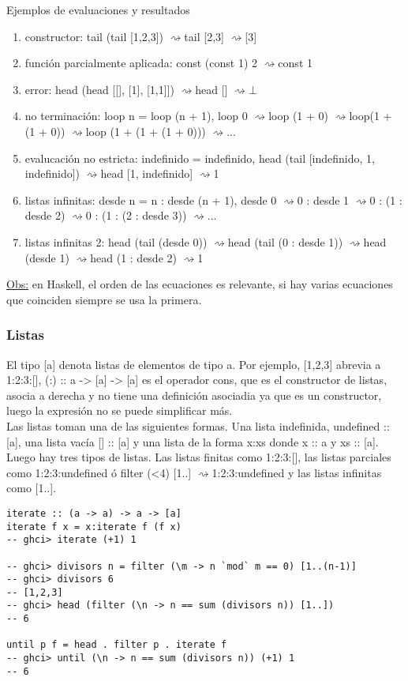 \documentclass[12pt]{extarticle}
\def\observacion{\underline{Obs:} }
\def\eval{$\rightsquigarrow$}
\begin{document}
Ejemplos de evaluaciones y resultados
\begin{enumerate}
\itemsep-0.35em 
\item constructor: tail (tail [1,2,3]) \eval tail [2,3] \eval [3]
\item función parcialmente aplicada: const (const 1) 2 \eval const 1
\item error: head (head [[], [1], [1,1]]) \eval head [] \eval $\bot$
\item no terminación: loop n = loop (n + 1), loop 0 \eval loop (1 + 0) \eval loop(1 + (1 + 0)) \eval loop (1 + (1 + (1 + 0))) \eval ...
\item evalucación no estricta: indefinido = indefinido, head (tail [indefinido, 1, indefinido]) \eval head [1, indefinido] \eval 1
\item listas infinitas: desde n = n : desde (n + 1), desde 0 \eval 0 : desde 1 \eval 0 : (1 : desde 2) \eval 0 : (1 : (2 : desde 3)) \eval ...
\item listas infinitas 2: head (tail (desde 0)) \eval head (tail (0 : desde 1)) \eval head (desde 1) \eval head (1 : desde 2) \eval 1
\end{enumerate}

\observacion en Haskell, el orden de las ecuaciones es relevante, si hay varias ecuaciones que coinciden siempre se usa la primera.

\subsubsection{Listas}
El tipo [a] denota listas de elementos de tipo a. Por ejemplo, [1,2,3] abrevia a 1:2:3:[], (:) :: a -> [a] -> [a] es el operador cons, que es el constructor de listas, asocia a derecha y no tiene una definición asociadia ya que es un constructor, luego la expresión no se puede simplificar más. \\
Las listas toman una de las siguientes formas. Una lista indefinida, undefined :: [a], una lista vacía [] :: [a] y una lista de la forma x:xs donde x :: a y xs :: [a]. \\
Luego hay tres tipos de listas. Las listas finitas como 1:2:3:[], las listas parciales como 1:2:3:undefined ó filter (<4) [1..] \eval 1:2:3:undefined y las listas infinitas como [1..]. \\

\begin{verbatim}
iterate :: (a -> a) -> a -> [a]
iterate f x = x:iterate f (f x)
-- ghci> iterate (+1) 1

-- ghci> divisors n = filter (\m -> n `mod` m == 0) [1..(n-1)]
-- ghci> divisors 6
-- [1,2,3]
-- ghci> head (filter (\n -> n == sum (divisors n)) [1..])
-- 6

until p f = head . filter p . iterate f
-- ghci> until (\n -> n == sum (divisors n)) (+1) 1
-- 6
\end{verbatim}
\end{document}

